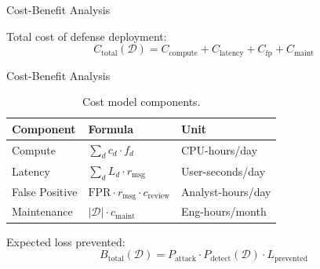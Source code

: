 \documentclass[
  ignorenonframetext,
]{beamer}
\begin{document}
\begin{frame}[allowframebreaks]{Cost-Benefit Analysis}
\begin{definition}
\label{def:defense-cost}
Total cost of defense deployment:
\begin{equation}
\label{eq:defense-cost}
C_{\text{total}}(\mathcal{D}) = C_{\text{compute}} + C_{\text{latency}} + C_{\text{fp}} + C_{\text{maint}}
\end{equation}
\end{definition}

\end{frame}

\begin{frame}[allowframebreaks]{Cost-Benefit Analysis}
\begin{table}[htbp]
\centering
\caption{Cost model components.}
\label{tab:cost-components}
\begin{tabular}{@{}llp{4cm}@{}}
\toprule
Component & Formula & Unit \\
\midrule
Compute & $\sum_d c_d \cdot f_d$ & CPU-hours/day \\
Latency & $\sum_d L_d \cdot r_{\text{msg}}$ & User-seconds/day \\
False Positive & $\text{FPR} \cdot r_{\text{msg}} \cdot c_{\text{review}}$ & Analyst-hours/day \\
Maintenance & $|\mathcal{D}| \cdot c_{\text{maint}}$ & Eng-hours/month \\
\bottomrule
\end{tabular}
\end{table}

\begin{definition}
\label{def:defense-benefit}
Expected loss prevented:
\begin{equation}
\label{eq:defense-benefit}
B_{\text{total}}(\mathcal{D}) = P_{\text{attack}} \cdot P_{\text{detect}}(\mathcal{D}) \cdot L_{\text{prevented}}
\end{equation}
\end{definition}

\end{frame}
\end{document}
